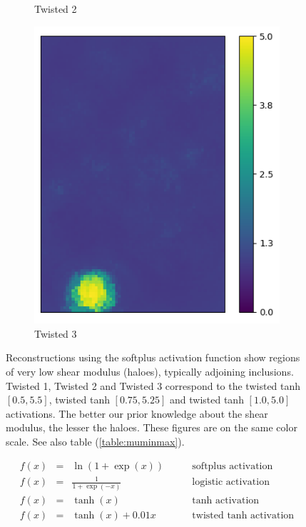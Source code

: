 \documentclass[12pt]{article}
\newcommand{\nhghaloesheight}{3.1cm}
\newcommand{\nhghaloeswidth}{0.19\linewidth}
\begin{document}
\begin{figure}[!h]
\begin{subfigure}[c]{\nhghaloeswidth}
    \caption{\label{fig:haloes_tanhp25} Twisted 2}        
  \end{subfigure}
  \begin{subfigure}[c]{\nhghaloeswidth}
    \centering
    \includegraphics[totalheight=\nhghaloesheight]{Figures/softplus_halos/ex1/mutanhshift0.png}
    \caption{\label{fig:haloes_tanhp0} Twisted 3}    
  \end{subfigure}     
  \caption{\label{fig:haloes} Reconstructions using the softplus activation function show regions of very low shear modulus (haloes), typically adjoining inclusions. Twisted 1, Twisted 2 and Twisted 3 correspond to the twisted tanh $[0.5, 5.5]$, twisted tanh $[0.75,5.25]$ and twisted tanh $[1.0,5.0]$ activations. The better our prior knowledge about the shear modulus, the lesser the haloes. These figures are on the same color scale. See also table (\ref{table:muminmax}).}
\end{figure}
% 
\begin{subequations}
\begin{align}
f(x) &= &\ln(1+\exp(x)) \qquad &\text{softplus activation}\label{eqn:softplus}\\
f(x) &= &\frac{1}{1+\exp(-x)} \qquad &\text{logistic activation} \label{eqn:logistic}\\
f(x) &= &\tanh(x) \qquad &\text{tanh activation} \label{eqn:tanh}\\
f(x) &= &\tanh(x) + 0.01x \qquad &\text{twisted tanh activation} \label{eqn:twisttanh}
\end{align}
\label{eqn:activations}
\end{subequations}
\end{document}
